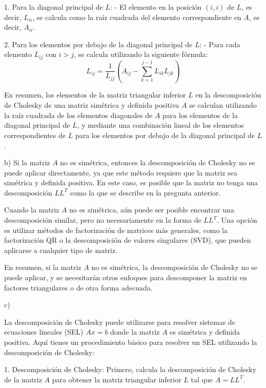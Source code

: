 \documentclass[a4paper,12pt]{article}
\begin{document}
1. Para la diagonal principal de \( L \):
   - El elemento en la posición \( (i, i) \) de \( L \), es decir, \( L_{ii} \), se calcula como la raíz cuadrada del elemento correspondiente en \( A \), es decir, \( A_{ii} \).

2. Para los elementos por debajo de la diagonal principal de \( L \):
   - Para cada elemento \( L_{ij} \) con \( i > j \), se calcula utilizando la siguiente fórmula:
     \[ L_{ij} = \frac{1}{L_{jj}} \left( A_{ij} - \sum_{k=1}^{j-1} L_{ik}L_{jk} \right) \]

En resumen, los elementos de la matriz triangular inferior \( L \) en la descomposición de Cholesky de una matriz simétrica y definida positiva \( A \) se calculan utilizando la raíz cuadrada de los elementos diagonales de \( A \) para los elementos de la diagonal principal de \( L \), y mediante una combinación lineal de los elementos correspondientes de \( L \) para los elementos por debajo de la diagonal principal de \( L \).

b)
Si la matriz \( A \) no es simétrica, entonces la descomposición de Cholesky no se puede aplicar directamente, ya que este método requiere que la matriz sea simétrica y definida positiva. En este caso, es posible que la matriz no tenga una descomposición \( LL^T \) como la que se describe en la pregunta anterior.

Cuando la matriz \( A \) no es simétrica, aún puede ser posible encontrar una descomposición similar, pero no necesariamente en la forma de \( LL^T \). Una opción es utilizar métodos de factorización de matrices más generales, como la factorización QR o la descomposición de valores singulares (SVD), que pueden aplicarse a cualquier tipo de matriz.

En resumen, si la matriz \( A \) no es simétrica, la descomposición de Cholesky no se puede aplicar, y se necesitarán otros enfoques para descomponer la matriz en factores triangulares o de otra forma adecuada.

c)

La descomposición de Cholesky puede utilizarse para resolver sistemas de ecuaciones lineales (SEL) \( Ax = b \) donde la matriz \( A \) es simétrica y definida positiva. Aquí tienes un procedimiento básico para resolver un SEL utilizando la descomposición de Cholesky:

1. Descomposición de Cholesky: Primero, calcula la descomposición de Cholesky de la matriz \( A \) para obtener la matriz triangular inferior \( L \) tal que \( A = LL^T \).
\end{document}
